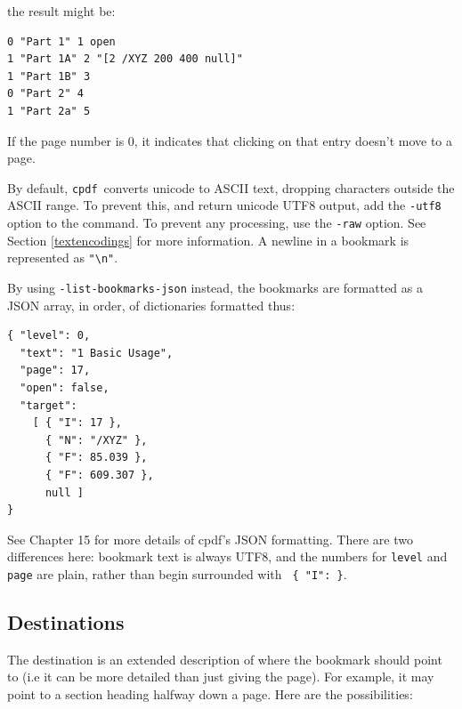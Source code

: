 \documentclass{book}
\newcommand{\cpdf}{\texttt{cpdf}}
\begin{document}
\noindent the result might be:
\begin{framed}{\small\begin{verbatim}
0 "Part 1" 1 open
1 "Part 1A" 2 "[2 /XYZ 200 400 null]"
1 "Part 1B" 3
0 "Part 2" 4
1 "Part 2a" 5\end{verbatim}}\end{framed}
\noindent If the page number is 0, it indicates that clicking on that entry doesn't move to a page.

By default, \cpdf\ converts unicode to ASCII text, dropping characters outside
the ASCII range. To prevent this, and return unicode UTF8 output, add the
\texttt{-utf8} option to the command. To prevent any processing, use the
\texttt{-raw} option. See Section \ref{textencodings} for more information. A newline in a bookmark is represented as \texttt{"\textbackslash n"}.

By using \texttt{-list-bookmarks-json} instead, the bookmarks are formatted as a JSON array, in order, of dictionaries formatted thus:

\begin{verbatim}
{ "level": 0,
  "text": "1 Basic Usage",
  "page": 17,
  "open": false,
  "target":
    [ { "I": 17 },
      { "N": "/XYZ" },
      { "F": 85.039 },
      { "F": 609.307 },
      null ]
}
\end{verbatim}

\noindent See Chapter 15 for more details of cpdf's JSON formatting. There are two differences here: bookmark text is always UTF8, and the numbers for \texttt{level} and \texttt{page} are plain, rather than begin surrounded with \texttt{ \{ "I": \}}.

\subsection{Destinations}

\label{destinations}
The destination is an extended description of where the bookmark should point to (i.e it can be more detailed than just giving the page). For example, it may point to a section heading halfway down a page. Here are the possibilities:

\medskip
\end{document}
